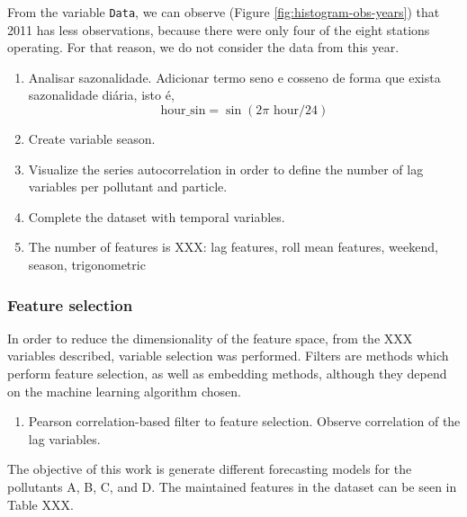 From the variable {\tt Data}, we can observe (Figure
\ref{fig:histogram-obs-years}) that 2011 has less observations, because there
were only four of the eight stations operating. For that reason, we do not
consider the data from this year. 

\begin{enumerate}
    \item Analisar sazonalidade. Adicionar termo seno e cosseno de forma que
    exista sazonalidade diária, isto é, 
    $$
    \text{hour\_sin} = \sin(2\pi \text{ hour}/24)
    $$
    \item Create variable season. 
    \item Visualize the series autocorrelation in order to define the number
    of lag variables per pollutant and particle.
    \item Complete the dataset with temporal variables.     
    \item The number of features is XXX: lag features, roll mean features,
    weekend, season, trigonometric  
\end{enumerate}

\subsubsection{Feature selection}

In order to reduce the dimensionality of the feature space, from the XXX
variables described, variable selection was performed. Filters are methods
which perform feature selection, as well as embedding methods, although they
depend on the machine learning algorithm chosen. 

\begin{enumerate}
    \item Pearson correlation-based filter to feature selection. Observe
    correlation of the lag variables. 
\end{enumerate}

The objective of this work is generate different forecasting models for the
pollutants A, B, C, and D. The maintained features in the dataset can be seen
in Table XXX.


